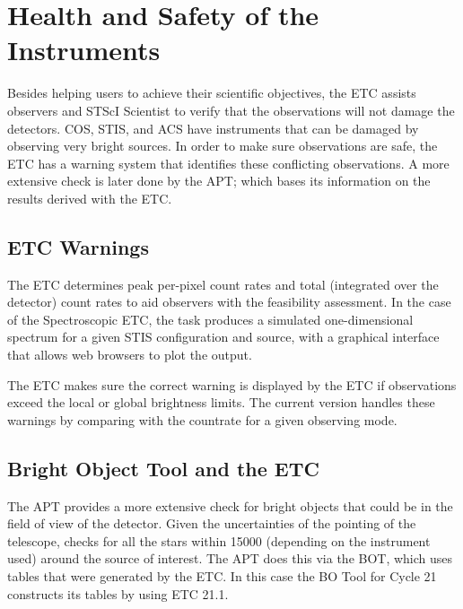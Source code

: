 \section{Health and Safety of the Instruments}

Besides helping users to achieve their scientific objectives, the ETC assists observers and STScI Scientist to verify that the observations will not damage the detectors. COS, STIS, and ACS have instruments that can be damaged  by observing very bright sources. In order to make sure observations are safe, the ETC has a warning system that identifies these conflicting observations. A more extensive check is later done by the APT; which bases its information on the results derived with the ETC.

\subsection{ETC Warnings}

The ETC determines peak per-pixel count rates and total (integrated over the detector) count rates to aid observers with the feasibility assessment. In the case of the Spectroscopic ETC, the task produces a simulated one-dimensional spectrum for a given STIS configuration and source, with a graphical interface that allows web browsers to plot the output.

The ETC makes sure the correct warning is displayed by the ETC if observations exceed the local or global brightness limits. The current version handles these warnings by comparing with the countrate for a given observing mode.


\subsection{Bright Object  Tool and the ETC}

The APT provides a more extensive check for bright objects that could be in the field of view of the detector. Given the uncertainties of the pointing of the telescope, checks for all the stars within 15000 (depending on the instrument used) around the source of interest. The APT does this via the BOT, which uses tables that were generated by the ETC.  In this case the BO Tool for Cycle 21 constructs its tables by using ETC 21.1. 


